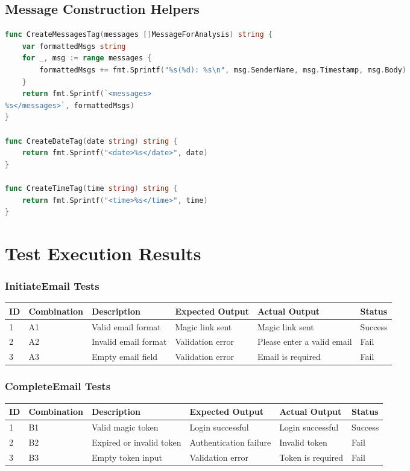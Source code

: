 \newpage

\section{Message Construction Helpers}

\begin{lstlisting}[language=Go]
func CreateMessagesTag(messages []MessageForAnalysis) string {
	var formattedMsgs string
	for _, msg := range messages {
		formattedMsgs += fmt.Sprintf("%s(%d): %s\n", msg.SenderName, msg.Timestamp, msg.Body)
	}
	return fmt.Sprintf(`<messages>
%s</messages>`, formattedMsgs)
}

func CreateDateTag(date string) string {
	return fmt.Sprintf("<date>%s</date>", date)
}

func CreateTimeTag(time string) string {
	return fmt.Sprintf("<time>%s</time>", time)
}
\end{lstlisting}


\chapter{Test Execution Results}
\label{appendix:test-execution}

\subsection*{InitiateEmail Tests}

\begin{longtable}{|p{1cm}|p{2cm}|p{3cm}|p{2.5cm}|p{3cm}|p{1.5cm}|}
\hline
\textbf{ID} & \textbf{Combination} & \textbf{Description} & \textbf{Expected Output} & \textbf{Actual Output} & \textbf{Status} \\
\hline
1 & A1 & Valid email format & Magic link sent & Magic link sent & Success \\
\hline
2 & A2 & Invalid email format & Validation error & Please enter a valid email & Fail \\
\hline
3 & A3 & Empty email field & Validation error & Email is required & Fail \\
\hline
\end{longtable}

\subsection*{CompleteEmail Tests}

\begin{longtable}{|p{1cm}|p{2cm}|p{3.2cm}|p{2.5cm}|p{3cm}|p{1.5cm}|}
\hline
\textbf{ID} & \textbf{Combination} & \textbf{Description} & \textbf{Expected Output} & \textbf{Actual Output} & \textbf{Status} \\
\hline
1 & B1 & Valid magic token & Login successful & Login successful & Success \\
\hline
2 & B2 & Expired or invalid token & Authentication failure & Invalid token & Fail \\
\hline
3 & B3 & Empty token input & Validation error & Token is required & Fail \\
\hline
\end{longtable}

